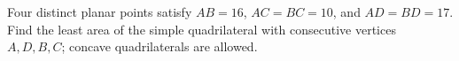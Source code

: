 Four distinct planar points satisfy $AB=16$, $AC=BC=10$, and $AD=BD=17$. Find the least area of the simple quadrilateral with consecutive vertices $A,D,B,C$; concave quadrilaterals are allowed.
